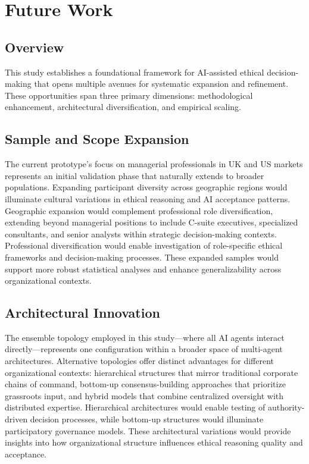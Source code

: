 \section{Future Work}

\subsection{Overview}

This study establishes a foundational framework for AI-assisted ethical decision-making that opens multiple avenues for systematic expansion and refinement. These opportunities span three primary dimensions: methodological enhancement, architectural diversification, and empirical scaling.

\subsection{Sample and Scope Expansion}

The current prototype's focus on managerial professionals in UK and US markets represents an initial validation phase that naturally extends to broader populations. Expanding participant diversity across geographic regions would illuminate cultural variations in ethical reasoning and AI acceptance patterns. Geographic expansion would complement professional role diversification, extending beyond managerial positions to include C-suite executives, specialized consultants, and senior analysts within strategic decision-making contexts. Professional diversification would enable investigation of role-specific ethical frameworks and decision-making processes. These expanded samples would support more robust statistical analyses and enhance generalizability across organizational contexts.

\subsection{Architectural Innovation}

The ensemble topology employed in this study—where all AI agents interact directly—represents one configuration within a broader space of multi-agent architectures. Alternative topologies offer distinct advantages for different organizational contexts: hierarchical structures that mirror traditional corporate chains of command, bottom-up consensus-building approaches that prioritize grassroots input, and hybrid models that combine centralized oversight with distributed expertise. Hierarchical architectures would enable testing of authority-driven decision processes, while bottom-up structures would illuminate participatory governance models. These architectural variations would provide insights into how organizational structure influences ethical reasoning quality and acceptance.

